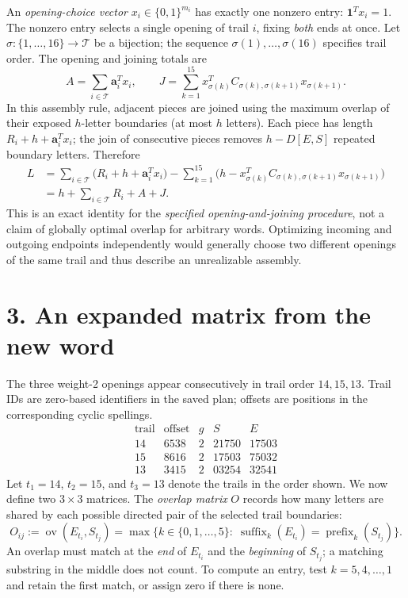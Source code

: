 \documentclass[11pt]{article}
\begin{document}
An \emph{opening-choice vector} \(x_i\in\{0,1\}^{m_i}\) has exactly one
nonzero entry: \(\mathbf1^T x_i=1\). The nonzero entry selects a single
opening of trail \(i\), fixing \emph{both} ends at once. Let
\(\sigma:\{1,\ldots,16\}\to\mathcal T\) be a bijection; the
sequence \(\sigma(1),\ldots,\sigma(16)\) specifies trail order. The opening and joining totals are
\[
A=\sum_{i\in\mathcal T}\mathbf a_i^T x_i,
\qquad
J=\sum_{k=1}^{15}
x_{\sigma(k)}^T C_{\sigma(k),\sigma(k+1)}
x_{\sigma(k+1)}.
\]
In this assembly rule, adjacent pieces are joined using the maximum
overlap of their exposed \(h\)-letter boundaries (at most \(h\) letters).
Each piece has length \(R_i+h+\mathbf a_i^Tx_i\); the join of consecutive
pieces removes \(h-D[E,S]\) repeated boundary letters. Therefore
\[
\begin{aligned}
L&=\sum_{i\in\mathcal T}\bigl(R_i+h+\mathbf a_i^T x_i\bigr)
   -\sum_{k=1}^{15}\bigl(h-
     x_{\sigma(k)}^T C_{\sigma(k),\sigma(k+1)}
     x_{\sigma(k+1)}\bigr)\\
 &=\boxed{h+\sum_{i\in\mathcal T}R_i+A+J}.
\end{aligned}
\]
This is an exact identity for the \emph{specified opening-and-joining
procedure}, not a claim of globally optimal overlap for arbitrary words.
Optimizing incoming and outgoing endpoints independently would generally
choose two different openings of the same trail and thus describe an
unrealizable assembly.

\section*{3. An expanded matrix from the new word}
The three weight-2 openings appear consecutively in trail order
\(14,15,13\). Trail IDs are zero-based identifiers in the saved plan;
offsets are positions in the corresponding cyclic spellings.
\[
\begin{array}{c|r|c|c|c}
\text{trail}&\text{offset}&g&S&E\\ \hline
14&6538&2&21750&17503\\
15&8616&2&17503&75032\\
13&3415&2&03254&32541
\end{array}
\]
Let $t_1=14$, $t_2=15$, and $t_3=13$ denote the trails in the
order shown. We now define two $3\times3$ matrices. The
\emph{overlap matrix} $O$ records how many letters are shared by each
possible directed pair of the selected trail boundaries:
\[
\boxed{
O_{ij}:=\operatorname{ov}(E_{t_i},S_{t_j})
=\max\bigl\{k\in\{0,1,\ldots,5\}:\;
\operatorname{suffix}_k(E_{t_i})
=\operatorname{prefix}_k(S_{t_j})\bigr\}.
}
\]
An overlap must match at the \emph{end} of $E_{t_i}$ and the
\emph{beginning} of $S_{t_j}$; a matching substring in the middle does
not count. To compute an entry, test $k=5,4,\ldots,1$ and retain the
first match, or assign zero if there is none.
\end{document}
